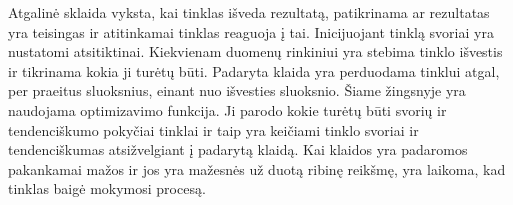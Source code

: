 \documentclass{VUMIFInfKursinis}
\begin{document}
Atgalinė sklaida vyksta, kai tinklas išveda rezultatą, patikrinama ar
rezultatas yra teisingas ir atitinkamai tinklas reaguoja į tai. Inicijuojant tinklą svoriai yra
nustatomi atsitiktinai. Kiekvienam duomenų rinkiniui yra stebima tinklo išvestis ir tikrinama kokia
ji turėtų būti. Padaryta klaida yra perduodama tinklui atgal, per praeitus sluoksnius, einant nuo
išvesties sluoksnio. Šiame žingsnyje yra naudojama optimizavimo funkcija. Ji parodo kokie turėtų būti
svorių ir tendenciškumo pokyčiai tinklai ir taip yra
keičiami tinklo svoriai ir tendenciškumas atsižvelgiant į padarytą klaidą. Kai klaidos
yra padaromos pakankamai mažos ir jos yra mažesnės už duotą ribinę reikšmę, yra laikoma, kad tinklas
baigė mokymosi procesą.
\end{document}
